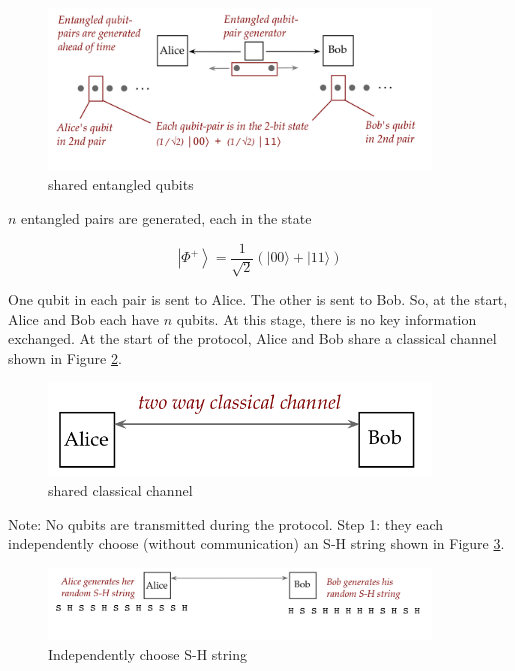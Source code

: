 \documentclass[main.tex]{subfiles}
\begin{document}
    \begin{figure}
        \centering
        \includegraphics[width=4in]{notes/figs/n06/11ekert2.png}
        \caption{shared entangled qubits}
        \label{fig:11ekert2}
    \end{figure}
    
    $n$ entangled pairs are generated, each in the state
    
    $$
    \left|\Phi^{+}\right\rangle=\frac{1}{\sqrt{2}}(|00\rangle+|11\rangle)
    $$
    
    One qubit in each pair is sent to Alice. The other is sent to Bob. So, at the start, Alice and Bob each have $n$ qubits. At this stage, there is no key information exchanged. At the start of the protocol, Alice and Bob share a classical channel shown in Figure \ref{fig:12ekert1}.

    \begin{figure}
        \centering
        \includegraphics[width=4in]{notes/figs/n06/12ekert1.png}
        \caption{shared classical channel}
        \label{fig:12ekert1}
    \end{figure}
    
    Note: No qubits are transmitted during the protocol. Step 1: they each independently choose (without communication) an S-H string shown in Figure \ref{fig:13ekert3}.
    
    \begin{figure}
        \centering
        \includegraphics[width=4in]{notes/figs/n06/13ekert3.png}
        \caption{Independently choose S-H string}
        \label{fig:13ekert3}
    \end{figure}
    
\end{document}
